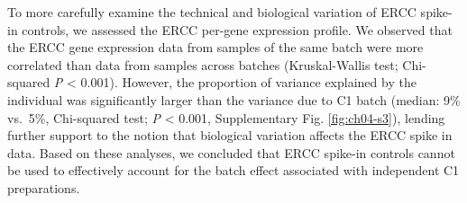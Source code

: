 To more carefully examine the technical and biological variation of ERCC
spike-in controls, we assessed the ERCC per-gene expression profile. We
observed that the ERCC gene expression data from samples of the same
batch were more correlated than data from samples across batches
(Kruskal-Wallis test; Chi-squared \emph{P} \textless{} 0.001). However,
the proportion of variance explained by the individual was significantly
larger than the variance due to C1 batch (median: 9\% vs.~5\%,
Chi-squared test; \emph{P} \textless{} 0.001, Supplementary Fig. \ref{fig:ch04-s3}),
lending further support to the notion that biological variation affects
the ERCC spike in data. Based on these analyses, we concluded that ERCC
spike-in controls cannot be used to effectively account for the batch
effect associated with independent C1 preparations.

